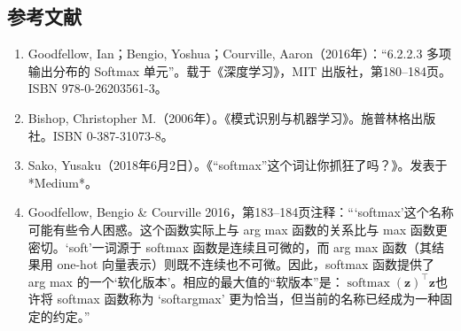 \subsection{参考文献}
\begin{enumerate}
\item Goodfellow, Ian；Bengio, Yoshua；Courville, Aaron（2016年）：“6.2.2.3 多项输出分布的 Softmax 单元”。载于《深度学习》，MIT 出版社，第180–184页。ISBN 978-0-26203561-3。
\item Bishop, Christopher M.（2006年）。《模式识别与机器学习》。施普林格出版社。ISBN 0-387-31073-8。
\item Sako, Yusaku（2018年6月2日）。《“softmax”这个词让你抓狂了吗？》。发表于 *Medium*。
\item Goodfellow, Bengio & Courville 2016，第183–184页注释：“‘softmax’这个名称可能有些令人困惑。这个函数实际上与 arg max 函数的关系比与 max 函数更密切。‘soft’一词源于 softmax 函数是连续且可微的，而 arg max 函数（其结果用 one-hot 向量表示）则既不连续也不可微。因此，softmax 函数提供了 arg max 的一个‘软化版本’。相应的最大值的“软版本”是：$\operatorname{softmax}(\mathbf{z})^\top \mathbf{z}$也许将 softmax 函数称为 ‘softargmax’ 更为恰当，但当前的名称已经成为一种固定的约定。”



\end{enumerate}
